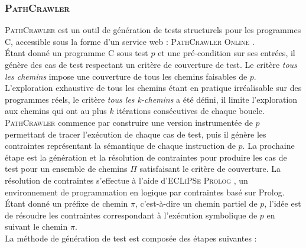 \subsubsection{\textsc{PathCrawler}}
\label{sec:PathCrawler}


\textsc{PathCrawler} \cite{PathCrawler} est un outil de génération de tests
structurels pour les programmes C, accessible sous la forme d'un service web :
\textsc{PathCrawler Online} \cite{PathCrawlerOnline}.\\

Étant donné un programme C sous test $p$ et une pré-condition sur ses entrées,
il génère des cas de test respectant un critère de couverture de test. Le
critère \emph{tous les chemins} impose une couverture de tous les chemins
faisables de $p$. L'exploration exhaustive de tous les chemins étant en pratique
irréalisable sur des programmes réels, le critère \emph{tous les k-chemins} a
été défini, il limite l'exploration aux chemins qui ont au plus $k$ itérations
consécutives de chaque boucle.\\

\textsc{PathCrawler} commence par construire une version instrumentée de $p$
permettant de tracer l'exécution de chaque cas de test, puis il génère les
contraintes représentant la sémantique de chaque instruction de $p$. La
prochaine étape est la génération et la résolution de contraintes pour produire
les cas de test pour un ensemble de chemins $\Pi$ satisfaisant le critère de
couverture. La résolution de contraintes s'effectue à l'aide
d'\textsc{ECLiPSe Prolog} \cite{ECLiPSe}, un environnement de programmation en
logique par contraintes basé sur Prolog.\\

Étant donné un préfixe de chemin $\pi$, c'est-à-dire un chemin partiel de $p$,
l'idée est de résoudre les contraintes correspondant à l'exécution symbolique
de $p$ en suivant le chemin $\pi$.\\
 
La méthode de génération de test est composée des étapes suivantes :

